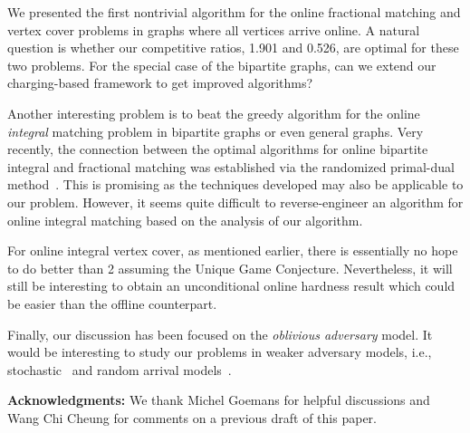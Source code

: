 \documentclass{article}
\begin{document}

We presented the first nontrivial algorithm for the online fractional matching and vertex cover problems in graphs where all vertices arrive online. A natural question is whether our competitive ratios, 1.901 and 0.526, are optimal for these two problems. For the special case of the bipartite graphs, can we extend our charging-based framework to get improved algorithms?

Another interesting problem is to beat the greedy algorithm for the online {\em integral} matching problem in bipartite graphs or even general graphs. Very recently, the connection between the optimal algorithms for online bipartite integral and fractional matching was established via the randomized primal-dual method~\cite{devanurrandomized}. This is promising as the techniques developed may also be applicable to our problem. However, it seems quite difficult to reverse-engineer an algorithm for online integral matching based on the analysis of our algorithm.


For online integral vertex cover, as mentioned earlier, there is essentially no hope to do better than 2 assuming the Unique Game Conjecture. Nevertheless, it will still be interesting to obtain an unconditional online hardness result which could be easier than the offline counterpart.

Finally, our discussion has been focused on the {\em oblivious adversary} model. It would be interesting to study our problems in weaker adversary models, i.e., stochastic~\cite{Feldman2009,Manshadi2011} and random arrival models~\cite{Mahdian2011,Karande2011}.


{\noindent \bf Acknowledgments:}  We thank Michel Goemans for helpful discussions and Wang Chi Cheung for comments on a previous draft of this paper.





\end{document}
